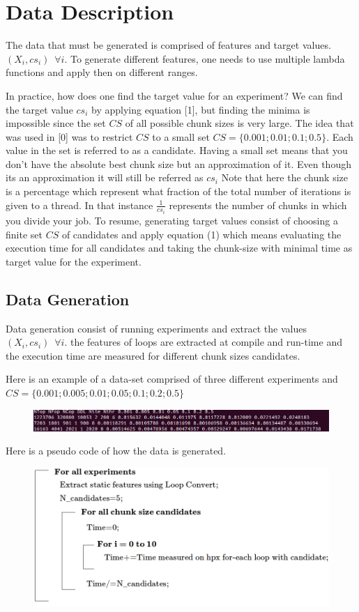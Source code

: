 \section{Data Description}
The data that must be generated is comprised of features and target values. $(X_i,cs_i) \, \, \, \forall i$. To generate different features, one needs to use multiple lambda functions and apply then on different ranges.

In practice, how does one find the target value for an experiment? We can find the target value $cs_i$ by applying equation [1], but finding the minima is impossible since the set $CS$ of all possible chunk sizes is very large. The idea that was used in [0] was to restrict $CS$ to a small set
$CS=\{0.001;0.01;0.1;0.5\}$. Each value in the set is referred to as a candidate. Having a small set means that you don't have the absolute best chunk size but an approximation of it. Even though its an approximation it will still be referred as $cs_i$
Note that here the chunk size is a percentage which represent what fraction of the total number of iterations is given to a thread. In that instance $\frac{1}{cs_i}$ represents the number of chunks in which you divide your job. To resume, generating target values consist of choosing a finite set $CS$ of candidates and apply equation (1) which means evaluating the execution time for all candidates and taking the chunk-size with minimal time as target value for the experiment.


\subsection{Data Generation}
Data generation consist of running experiments and extract the values $(X_i,cs_i) \, \, \, \forall i$. the features of loops are extracted at compile and run-time and the execution time are measured for different chunk sizes candidates. 

Here is an example of a data-set comprised of three different experiments and $CS=\{0.001;0.005;0.01;0.05;0.1;0.2;0.5\}$

\begin{figure}[h]
	\centering
	\includegraphics[scale=0.45]{images/screenshot_data.png}
\end{figure}


Here is a pseudo code of how the data is generated.

\begin{figure}[h]
	\centering
	\includegraphics[scale=0.49]{images/pseudo-code.png}
\end{figure}